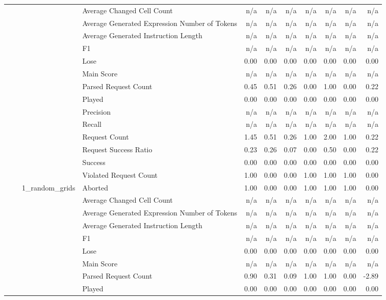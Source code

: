\begin{tabular}{llllrrrrrrr}
 &  &  & Average Changed Cell Count & n/a & n/a & n/a & n/a & n/a & n/a & n/a \\
 &  &  & Average Generated Expression Number of Tokens & n/a & n/a & n/a & n/a & n/a & n/a & n/a \\
 &  &  & Average Generated Instruction Length & n/a & n/a & n/a & n/a & n/a & n/a & n/a \\
 &  &  & F1 & n/a & n/a & n/a & n/a & n/a & n/a & n/a \\
 &  &  & Lose & 0.00 & 0.00 & 0.00 & 0.00 & 0.00 & 0.00 & 0.00 \\
 &  &  & Main Score & n/a & n/a & n/a & n/a & n/a & n/a & n/a \\
 &  &  & Parsed Request Count & 0.45 & 0.51 & 0.26 & 0.00 & 1.00 & 0.00 & 0.22 \\
 &  &  & Played & 0.00 & 0.00 & 0.00 & 0.00 & 0.00 & 0.00 & 0.00 \\
 &  &  & Precision & n/a & n/a & n/a & n/a & n/a & n/a & n/a \\
 &  &  & Recall & n/a & n/a & n/a & n/a & n/a & n/a & n/a \\
 &  &  & Request Count & 1.45 & 0.51 & 0.26 & 1.00 & 2.00 & 1.00 & 0.22 \\
 &  &  & Request Success Ratio & 0.23 & 0.26 & 0.07 & 0.00 & 0.50 & 0.00 & 0.22 \\
 &  &  & Success & 0.00 & 0.00 & 0.00 & 0.00 & 0.00 & 0.00 & 0.00 \\
 &  &  & Violated Request Count & 1.00 & 0.00 & 0.00 & 1.00 & 1.00 & 1.00 & 0.00 \\
\cline{3-11}
 &  & \multirow[t]{15}{*}{1_random_grids} & Aborted & 1.00 & 0.00 & 0.00 & 1.00 & 1.00 & 1.00 & 0.00 \\
 &  &  & Average Changed Cell Count & n/a & n/a & n/a & n/a & n/a & n/a & n/a \\
 &  &  & Average Generated Expression Number of Tokens & n/a & n/a & n/a & n/a & n/a & n/a & n/a \\
 &  &  & Average Generated Instruction Length & n/a & n/a & n/a & n/a & n/a & n/a & n/a \\
 &  &  & F1 & n/a & n/a & n/a & n/a & n/a & n/a & n/a \\
 &  &  & Lose & 0.00 & 0.00 & 0.00 & 0.00 & 0.00 & 0.00 & 0.00 \\
 &  &  & Main Score & n/a & n/a & n/a & n/a & n/a & n/a & n/a \\
 &  &  & Parsed Request Count & 0.90 & 0.31 & 0.09 & 1.00 & 1.00 & 0.00 & -2.89 \\
 &  &  & Played & 0.00 & 0.00 & 0.00 & 0.00 & 0.00 & 0.00 & 0.00 \\

\end{tabular}
